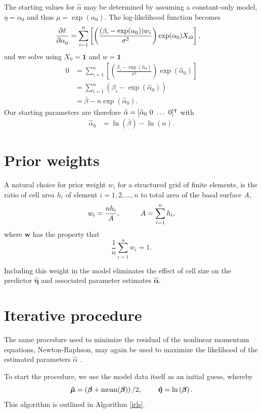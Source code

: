 The starting values for $\hat{\alpha}$ may be determined by assuming a constant-only model, \ie $\eta = \alpha_0$ and thus $\mu = \exp(\alpha_0)$.  The log-likelihood function becomes
\begin{align*}
  \frac{\partial^{} \ell}{\partial \alpha_0^{} } &= \sum_{i=1}^n \left[ \left( \frac{(\beta_i - \exp(\alpha_0))w_i}{\sigma^2} \right) \exp(\alpha_0) X_{i0} \right],
\end{align*}
and we solve using $X_{0} = \mathbf{1}$ and $w = \mathbf{1}$
\begin{align*}
  0 &= \sum_{i=1}^n \left[ \left( \frac{\beta_i - \exp\left( \hat{\alpha}_0 \right)}{\sigma^2} \right) \exp\left( \hat{\alpha}_0 \right) \right] \\
    &= \sum_{i=1}^n \left( \beta_i - \exp\left( \hat{\alpha}_0 \right) \right) \\
    &= \bar{\beta} - n \exp\left( \hat{\alpha}_0 \right).
\end{align*}
Our starting parameters are therefore $\hat{\alpha} = [ \hat{\alpha}_0\ 0\ \ldots\ 0]^\intercal$ with
\begin{align*}
  \hat{\alpha}_0 &= \ln\left( \bar{\beta} \right) - \ln(n).
\end{align*}

\section{Prior weights}

A natural choice for prior weight $w_i$ for a structured grid of finite elements, is the ratio of cell area $h_i$ of element $i = 1,2,\ldots, n$ to total area of the basal surface $A$,
$$w_i = \frac{n h_i}{A}, \hspace{10mm} A = \sum_{i=1}^n h_i,$$
where $\mathbf{w}$ has the property that
$$\frac{1}{n}\sum_{i=1}^n w_i = 1.$$

Including this weight in the model eliminates the effect of cell size on the predictor $\bm{\hat{\eta}}$ and associated parameter estimates $\bm{\hat{\alpha}}$.

\section{Iterative procedure}

The same procedure used to minimize the residual of the nonlinear momentum equations, Newton-Raphson, may again be used to maximize the likelihood of the estimated parameters $\hat{\alpha}$ \citep{mccullagh_1989}.

To start the procedure, we use the model data itself as an initial guess, whereby
$$\bm{\hat{\mu}} = \left(\bm{\beta} + \mathrm{mean}(\bm{\beta}) \right) / 2, \hspace{8mm} \bm{\hat{\eta}} = \ln\left( \bm{\beta} \right).$$
This algorithm is outlined in Algorithm \ref{irls}.

